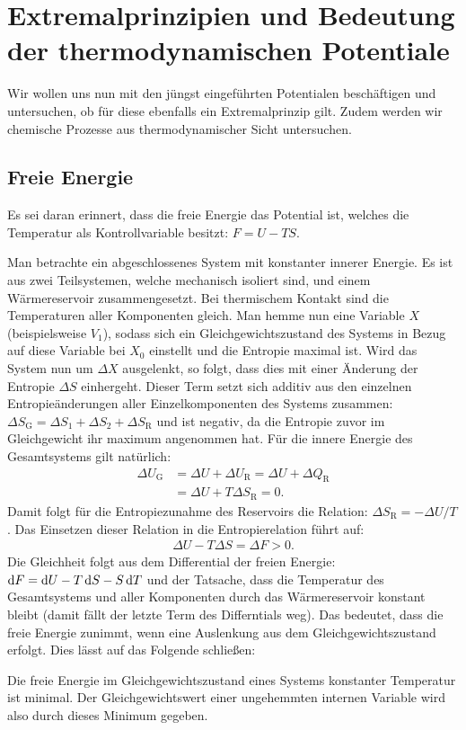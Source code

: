 
\chapter{Extremalprinzipien und Bedeutung der thermodynamischen Potentiale\label{sec:Extremalprinzipien und Bedeutung der thermodynamischen Potentiale}}
Wir wollen uns nun mit den jüngst eingeführten Potentialen beschäftigen und untersuchen, ob für diese ebenfalls ein Extremalprinzip gilt. Zudem werden wir chemische Prozesse aus thermodynamischer Sicht untersuchen.
\section{Freie Energie}
Es sei daran erinnert, dass die freie Energie das Potential ist, welches die Temperatur als Kontrollvariable besitzt: $F=U-TS$.

Man betrachte ein abgeschlossenes System mit konstanter innerer Energie. Es ist aus zwei Teilsystemen, welche mechanisch isoliert sind, und einem Wärmereservoir zusammengesetzt. Bei thermischem Kontakt sind die Temperaturen aller Komponenten gleich. Man hemme nun eine Variable $X$ (beispielsweise $V_1$), sodass sich ein Gleichgewichtszustand des Systems in Bezug auf diese Variable bei $X_0$ einstellt und die Entropie maximal ist. Wird das System nun um $\Delta X$ ausgelenkt, so folgt, dass dies mit einer Änderung der Entropie $\Delta S$ einhergeht. Dieser Term setzt sich additiv aus den einzelnen Entropieänderungen aller Einzelkomponenten des Systems zusammen: $\Delta S_\mathrm{G}=\Delta S_1+\Delta S_2+\Delta S_\mathrm{R}$ und ist negativ, da die Entropie zuvor im Gleichgewicht ihr maximum angenommen hat. Für die innere Energie des Gesamtsystems gilt natürlich:
\begin{align*}
    \Delta U_\mathrm{G} &= \Delta U + \Delta U_\mathrm{R}= \Delta U + \Delta Q_\mathrm{R}\\
    &=\Delta U + T\Delta S_\mathrm{R}=0.
\end{align*}
Damit folgt für die Entropiezunahme des Reservoirs die Relation: $\Delta S_\mathrm{R}=-\Delta U/T$. Das Einsetzen dieser Relation in die Entropierelation führt auf:
\begin{align*}
    \Delta U-T\Delta S=\Delta F>0.
\end{align*}
Die Gleichheit folgt aus dem Differential der freien Energie: $\mathop{}\!\mathrm{d} F=\mathop{}\!\mathrm{d} U-T\mathop{}\!\mathrm{d} S-S\mathop{}\!\mathrm{d} T$ und der Tatsache, dass die Temperatur des Gesamtsystems und aller Komponenten durch das Wärmereservoir konstant bleibt (damit fällt der letzte Term des Differntials weg).
Das bedeutet, dass die freie Energie zunimmt, wenn eine Auslenkung aus dem Gleichgewichtszustand erfolgt. Dies lässt auf das Folgende schließen:
\begin{formal}
    Die freie Energie im Gleichgewichtszustand eines Systems konstanter Temperatur ist minimal. Der Gleichgewichtswert einer ungehemmten internen Variable wird also durch dieses Minimum gegeben.
\end{formal}

